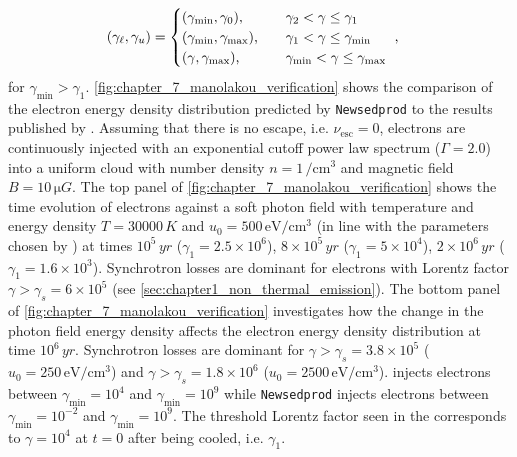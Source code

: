 \begin{equation}
    \begin{aligned}
  	  \qty(\gamma_\ell,\gamma_u)&=
  	  \begin{cases}
  		  \qty(\gamma_\text{min},\gamma_0)\text{,}\quad & \gamma_2<\gamma\leq\gamma_1 \\
   		 \qty(\gamma_\text{min},\gamma_\text{max})\text{,}\quad & \gamma_1<\gamma\leq\gamma_\text{min} \\
   		 \qty(\gamma,\gamma_\text{max})\text{,}\quad & \gamma_\text{min}<\gamma\leq\gamma_\text{max}
    	\end{cases}\text{ ,}
    \end{aligned}
\end{equation}
\noindent for $\gamma_\text{min}>\gamma_1$.
\newpar
\autoref{fig:chapter_7_manolakou_verification} shows the comparison of the electron energy density distribution predicted by {\tt Newsedprod} to the results published by \cite{2007A&A...474..689M}. Assuming that there is no escape, i.e. $\nu_\text{esc}=0$, electrons are continuously injected with an exponential cutoff power law spectrum ($\Gamma={2.0}$) into a uniform cloud with number density $n=1\,\si{\per\centi\meter\cubed}$ and magnetic field $B=10\,\si{\micro G}$. The top panel of \autoref{fig:chapter_7_manolakou_verification} shows the time evolution of electrons against a soft photon field with temperature and energy density $T=30000\,\si{K}$ and $u_0=500\,\si{\electronvolt\per\centi\meter\cubed}$ (in line with the parameters chosen by \cite{2007A&A...474..689M}) at times $10^5\,\si{yr}$ ($\gamma_1=2.5\times 10^6$), $8\times 10^5\,\si{yr}$ ($\gamma_1=5\times 10^4$), $2\times 10^6\,\si{yr}$ ($\gamma_1=1.6\times 10^3$). Synchrotron losses are dominant for electrons with Lorentz factor $\gamma>\gamma_s = 6\times 10^5$ (see \autoref{sec:chapter1_non_thermal_emission}). The bottom panel of \autoref{fig:chapter_7_manolakou_verification} investigates how the change in the photon field energy density affects the electron energy density distribution at time $10^6\,\si{yr}$. Synchrotron losses are dominant for $\gamma>\gamma_s=3.8\times 10^5$ ($u_0=250\,\si{\electronvolt\per\centi\meter\cubed}$) and $\gamma>\gamma_s=1.8\times 10^6$ ($u_0=2500\,\si{\electronvolt\per\centi\meter\cubed}$).  \cite{2007A&A...474..689M} injects electrons between $\gamma_\text{min}=10^4$ and $\gamma_\text{min}=10^9$ while {\tt Newsedprod} injects electrons between $\gamma_\text{min}=10^{-2}$ and $\gamma_\text{min}=10^9$. The threshold Lorentz factor seen in the \cite{2007A&A...474..689M} corresponds to $\gamma=10^4$ at $t=0$ after being cooled, i.e. $\gamma_1$.


